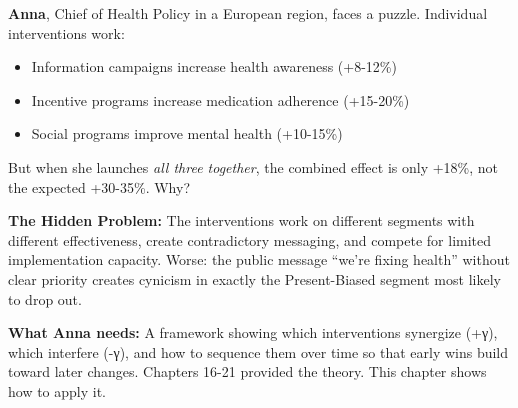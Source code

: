 \begin{tcolorbox}[colback=yellow!5!white, colframe=yellow!75!black, title=Intuition: Anna's Government Policy Challenge]

\textbf{Anna}, Chief of Health Policy in a European region, faces a puzzle. Individual interventions work:
\begin{itemize}[nosep]
\item Information campaigns increase health awareness (+8-12\%)
\item Incentive programs increase medication adherence (+15-20\%)
\item Social programs improve mental health (+10-15\%)
\end{itemize}

But when she launches \emph{all three together}, the combined effect is only +18\%, not the expected +30-35\%. Why?

\textbf{The Hidden Problem:} The interventions work on different segments with different effectiveness, create contradictory messaging, and compete for limited implementation capacity. Worse: the public message ``we're fixing health'' without clear priority creates cynicism in exactly the Present-Biased segment most likely to drop out.

\textbf{What Anna needs:} A framework showing which interventions synergize (+γ), which interfere (-γ), and how to sequence them over time so that early wins build toward later changes. Chapters 16-21 provided the theory. This chapter shows how to apply it.

\end{tcolorbox}


